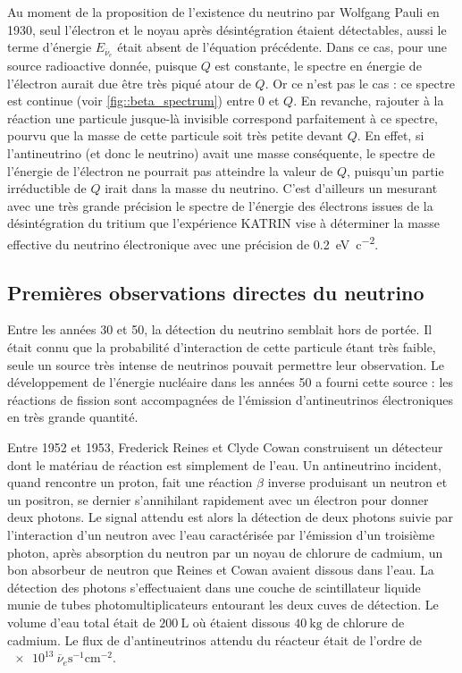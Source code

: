 	         Au moment de la proposition de l'existence du neutrino par Wolfgang Pauli en 1930\cite{Pauli1930}, seul l'électron et le noyau après désintégration étaient détectables, aussi le terme d'énergie $E_{\overline{\nu}_e}$ était absent de l'équation précédente. Dans ce cas, pour une source radioactive donnée, puisque $Q$ est constante, le spectre en énergie de l'électron aurait due être très piqué atour de $Q$. Or ce n'est pas le cas : ce spectre est continue (voir \autoref{fig::beta_spectrum}) entre 0 et $Q$. En revanche, rajouter à la réaction une particule jusque-là invisible correspond parfaitement à ce spectre, pourvu que la masse de cette particule soit très petite devant $Q$. En effet, si l'antineutrino (et donc le neutrino) avait une masse conséquente, le spectre de l'énergie de l'électron ne pourrait pas atteindre la valeur de $Q$, puisqu'un partie irréductible de $Q$ irait dans la masse du neutrino. C'est d'ailleurs un mesurant avec une très grande précision le spectre de l'énergie des électrons issues de la désintégration du tritium que l'expérience KATRIN\cite{Kleesiek2018} vise à déterminer la masse effective du neutrino électronique avec une précision de \SI{0.2}{\electronvolt\per c\squared}.
    
        \subsection{Premières observations directes du neutrino}
        
	        Entre les années 30 et 50, la détection du neutrino semblait hors de portée. Il était connu que la probabilité d'interaction de cette particule étant très faible, seule un source très intense de neutrinos pouvait permettre leur observation. Le développement de l'énergie nucléaire dans les années 50 a fourni cette source : les réactions de fission sont accompagnées de l'émission d'antineutrinos électroniques en très grande quantité.
	        
	        Entre 1952 et 1953, Frederick Reines et Clyde Cowan construisent un détecteur dont le matériau de réaction est simplement de l'eau. Un antineutrino incident, quand rencontre un proton, fait une réaction $\beta$ inverse produisant un neutron et un positron, se dernier s'annihilant rapidement avec un électron pour donner deux photons. Le signal attendu est alors la détection de deux photons suivie par l'interaction d'un neutron avec l'eau caractérisée par l'émission d'un troisième photon, après absorption du neutron par un noyau de chlorure de cadmium, un bon absorbeur de neutron que Reines et Cowan avaient dissous dans l'eau. La détection des photons s'effectuaient dans une couche de scintillateur liquide munie de tubes photomultiplicateurs entourant les deux cuves de détection. Le volume d'eau total était de $\SI{200}{\liter}$ où étaient dissous $\SI{40}{\kilogram}$ de chlorure de cadmium. Le flux de d'antineutrinos attendu du réacteur était de l'ordre de $\SI{e13}{\overline{\nu}_e\second^{-1}\centi\meter^{-2}}$.
	    
